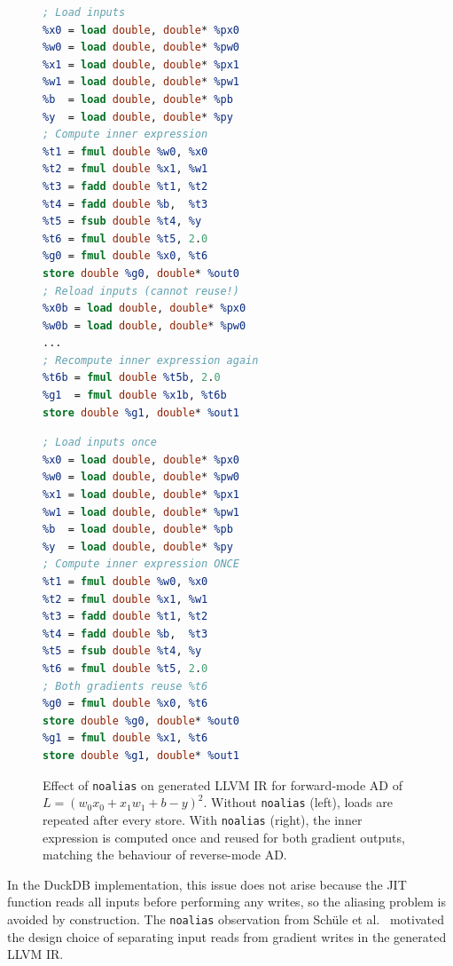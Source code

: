 \documentclass[12pt]{report}
\begin{document}
\begin{figure}[H]
\centering
\begin{minipage}{0.48\textwidth}
\begin{lstlisting}[language=llvm, basicstyle=\tiny\ttfamily,
    caption={Without \texttt{noalias}: inner expression recomputed},
    frame=single]
; Load inputs
%x0 = load double, double* %px0
%w0 = load double, double* %pw0
%x1 = load double, double* %px1
%w1 = load double, double* %pw1
%b  = load double, double* %pb
%y  = load double, double* %py
; Compute inner expression
%t1 = fmul double %w0, %x0
%t2 = fmul double %x1, %w1
%t3 = fadd double %t1, %t2
%t4 = fadd double %b,  %t3
%t5 = fsub double %t4, %y
%t6 = fmul double %t5, 2.0
%g0 = fmul double %x0, %t6
store double %g0, double* %out0
; Reload inputs (cannot reuse!)
%x0b = load double, double* %px0
%w0b = load double, double* %pw0
...
; Recompute inner expression again
%t6b = fmul double %t5b, 2.0
%g1  = fmul double %x1b, %t6b
store double %g1, double* %out1
\end{lstlisting}
\end{minipage}
\hfill
\begin{minipage}{0.48\textwidth}
\begin{lstlisting}[language=llvm, basicstyle=\tiny\ttfamily,
    caption={With \texttt{noalias}: inner expression reused},
    frame=single]
; Load inputs once
%x0 = load double, double* %px0
%w0 = load double, double* %pw0
%x1 = load double, double* %px1
%w1 = load double, double* %pw1
%b  = load double, double* %pb
%y  = load double, double* %py
; Compute inner expression ONCE
%t1 = fmul double %w0, %x0
%t2 = fmul double %x1, %w1
%t3 = fadd double %t1, %t2
%t4 = fadd double %b,  %t3
%t5 = fsub double %t4, %y
%t6 = fmul double %t5, 2.0
; Both gradients reuse %t6
%g0 = fmul double %x0, %t6
store double %g0, double* %out0
%g1 = fmul double %x1, %t6
store double %g1, double* %out1
\end{lstlisting}
\end{minipage}
\caption{Effect of \texttt{noalias} on generated LLVM IR for forward-mode
AD of $L = (w_0 x_0 + x_1 w_1 + b - y)^2$. Without \texttt{noalias}
(left), loads are repeated after every store. With \texttt{noalias} (right),
the inner expression is computed once and reused for both gradient outputs,
matching the behaviour of reverse-mode AD.}
\label{fig:llvm-noalias}
\end{figure}

In the DuckDB implementation, this issue does not arise because
the JIT function reads all inputs before performing any writes,
so the aliasing problem is avoided by construction. The
\texttt{noalias} observation from Schüle et al.~\cite{schule2022llvm}
motivated the design choice of separating input reads from gradient
writes in the generated LLVM IR.
\end{document}
